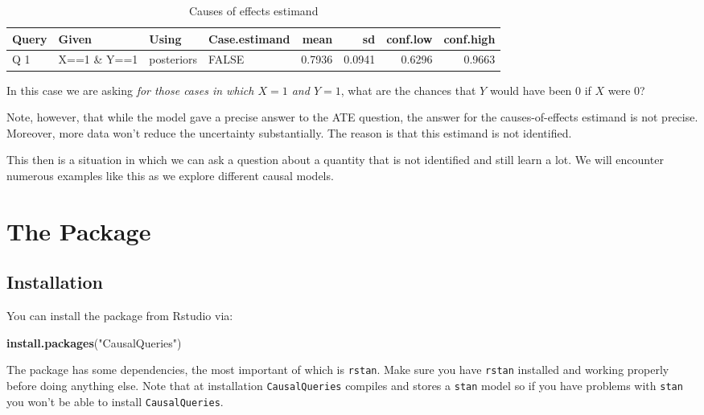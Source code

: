 \documentclass[
  12pt,
]{book}
\newenvironment{Shaded}{\begin{snugshade}}{\end{snugshade}}
\newcommand{\FunctionTok}[1]{\textcolor[rgb]{0.13,0.29,0.53}{\textbf{#1}}}
\newcommand{\NormalTok}[1]{#1}
\newcommand{\StringTok}[1]{\textcolor[rgb]{0.31,0.60,0.02}{#1}}
\begin{document}
\begin{table}

\caption{\label{tab:unnamed-chunk-11}Causes of effects estimand}
\centering
\begin{tabular}[t]{l|l|l|l|r|r|r|r}
\hline
Query & Given & Using & Case.estimand & mean & sd & conf.low & conf.high\\
\hline
Q 1 & X==1 \& Y==1 & posteriors & FALSE & 0.7936 & 0.0941 & 0.6296 & 0.9663\\
\hline
\end{tabular}
\end{table}

In this case we are asking \emph{for those cases in which \(X=1\) and \(Y=1\)}, what are the chances that \(Y\) would have been \(0\) if \(X\) were \(0\)?

Note, however, that while the model gave a precise answer to the ATE question, the answer for the causes-of-effects estimand is not precise. Moreover, more data won't reduce the uncertainty substantially. The reason is that this estimand is not identified.

This then is a situation in which we can ask a question about a quantity that is not identified and still learn a lot. We will encounter numerous examples like this as we explore different causal models.

\hypertarget{part-the-package}{%
\part{The Package}\label{part-the-package}}

\hypertarget{package}{%
\chapter{Installation}\label{package}}

You can install the package from Rstudio via:

\begin{Shaded}
\begin{Highlighting}[]
\FunctionTok{install.packages}\NormalTok{(}\StringTok{"CausalQueries"}\NormalTok{)}
\end{Highlighting}
\end{Shaded}

The package has some dependencies, the most important of which is \texttt{rstan}. Make sure you have \texttt{rstan} installed and working properly before doing anything else. Note that at installation \texttt{CausalQueries} compiles and stores a \texttt{stan} model so if you have problems with \texttt{stan} you won't be able to install \texttt{CausalQueries}.
\end{document}
